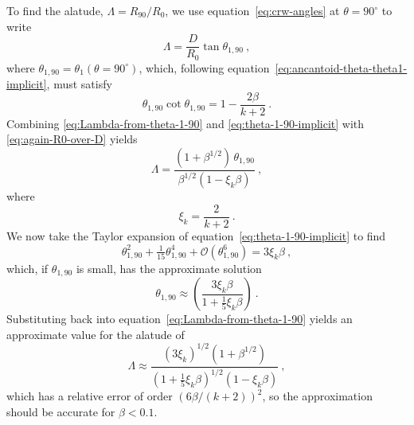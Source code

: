 To find the alatude, \(\Lambda = R_{90} / R_0\), we use equation~\eqref{eq:crw-angles} at \(\theta = 90^\circ\) to write
\begin{equation}
  \label{eq:Lambda-from-theta-1-90}
  \Lambda = \frac{D} {R_0} \tan \theta_{1,90} \ , 
\end{equation}
where \(\theta_{1,90} = \theta_1(\theta = 90^\circ)\), which, following
equation~\eqref{eq:ancantoid-theta-theta1-implicit}, must satisfy
\begin{equation}
  \label{eq:theta-1-90-implicit}
  \theta_{1,90} \cot \theta_{1,90}  = 1 - \frac{2 \beta}{k + 2} \ . 
\end{equation}
Combining \eqref{eq:Lambda-from-theta-1-90} and
\eqref{eq:theta-1-90-implicit} with \eqref{eq:again-R0-over-D} yields
\begin{equation}
  \label{eq:Lambda-beta-xi-theta-1-90}
  \Lambda = \frac{ \left(1 + \beta^{1/2}\right) \,\theta_{1,90}} {\beta^{1/2} \left(1 - \xi_k \beta\right)} \ ,
\end{equation}
where
\begin{equation}
  \label{eq:xi-k}
  \xi_k = \frac{2} {k +2} \ .
\end{equation}
We now take the Taylor expansion of equation~\eqref{eq:theta-1-90-implicit} to find
\begin{equation}
  \label{eq:theta-1-90-Taylor}
  \theta_{1,90}^2 + \tfrac{1}{15}  \theta_{1,90}^4 + \mathcal{O}(\theta_{1,90}^6)
  = 3 \xi_k \beta \ , 
\end{equation}
which, if \(\theta_{1,90}\) is small, has the approximate solution
\begin{equation}
  \label{eq:theta-1-90-approx}
  \theta_{1,90} \approx \left( \frac{3 \xi_k \beta} {1 + \tfrac15 \xi_k \beta} \right) \ .
\end{equation}
Substituting back into equation~\eqref{eq:Lambda-from-theta-1-90} yields an approximate value for the alatude of
\begin{equation}
  \label{eq:Lambda-approx}
  \Lambda \approx \frac {(3 \xi_k)^{1/2} \left( 1 + \beta^{1/2} \right)}
  { \left( 1 + \tfrac15 \xi_k \beta \right)^{1/2} \left( 1 - \xi_k \beta \right)} \ ,
\end{equation}
which has a relative error of order \((6 \beta / (k +2))^2\), so the approximation should be accurate for \(\beta < 0.1\). 


